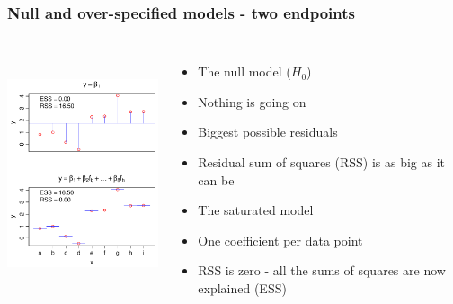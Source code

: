 \documentclass[aspectratio=43]{beamer}
\begin{document}
\begin{frame}[T]
\frametitle{Null and over-specified models - two endpoints}
\begin{columns}[T]

		\includegraphics[height=72mm]{NullSaturated.pdf}

		\begin{itemize}
		\item The null model ($H_0$)
		\item Nothing is going on
		\item Biggest possible residuals
		\item Residual sum of squares (RSS) is as big as it can be
		\vspace{1cm}
		\item The saturated model
		\item One coefficient per data point
		\item RSS is zero - all the sums of squares are now explained (ESS)
		\end{itemize}
		
\end{columns}
\end{frame}
\end{document}
